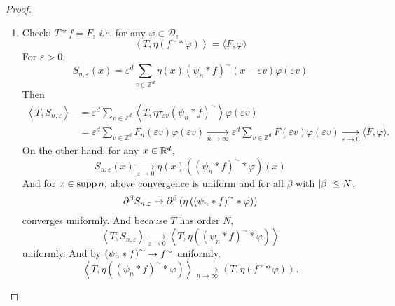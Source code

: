 \begin{enumerate}[label=\arabic*.]
\begin{proof}
\begin{enumerate}
			\item Check: $T * f = F$, \emph{i.e.} for any $\varphi \in \mathcal{D}$,
			\begin{equation*}
				\left\langle T, \eta\left(f^{\sim} * \varphi\right)\right\rangle=\langle F, \varphi\rangle
			\end{equation*}
			For $\varepsilon > 0$,
			\begin{equation*}
				S_{n, \varepsilon}(x)=\varepsilon^d \sum_{v \in \mathbb{Z}^d} \eta(x)\left(\psi_n * f\right)^{\sim}(x-\varepsilon v) \varphi(\varepsilon v)
			\end{equation*}
			Then
			\begin{equation*}
				\begin{aligned}
					\left\langle T, S_{n, \varepsilon}\right\rangle & =\varepsilon^d \sum_{v \in \mathbb{Z}^d}\left\langle T, \eta \tau_{\varepsilon v}\left(\psi_n * f\right)^{\sim}\right\rangle \varphi(\varepsilon v) \\
					& =\varepsilon^d \sum_{v \in \mathbb{Z}^d} F_n(\varepsilon v) \varphi(\varepsilon v) \underset{n \rightarrow \infty}{\rightarrow} \varepsilon^d \sum_{v \in \mathbb{Z}^d} F(\varepsilon v) \varphi(\varepsilon v) \underset{\varepsilon \rightarrow 0}{\rightarrow}\langle F, \varphi\rangle .
				\end{aligned}
			\end{equation*}
			On the other hand, for any $x \in \mathbb{R}^d$,
			\begin{equation*}
				S_{n, \varepsilon}(x) \underset{\varepsilon \rightarrow 0}{\rightarrow} \eta(x)\left(\left(\psi_n * f\right)^{\sim} * \varphi\right)(x)
			\end{equation*}
			And for $x \in \operatorname{supp} \eta$, above convergence is uniform and for all $\beta$ with $\left\lvert\beta\right\lvert \leq N$,
			\begin{equation*}
				\partial^\beta S_{n, \varepsilon} \rightarrow \partial^\beta\left(\eta\left(\left(\psi_n * f\right)^{\sim} * \varphi\right)\right)
			\end{equation*}
			converges uniformly. And because $T$ has order $N$,
			\begin{equation*}
				\left\langle T, S_{n, \varepsilon}\right\rangle \underset{\varepsilon \rightarrow 0}{\rightarrow}\left\langle T, \eta\left(\left(\psi_n * f\right)^{\sim} * \varphi\right)\right\rangle
			\end{equation*}
			uniformly. And by $\left(\psi_n * f\right)^{\sim}\rightarrow f^{\sim}$ uniformly,
			\begin{equation*}
				\left\langle T, \eta\left(\left(\psi_n * f\right)^{\sim} * \varphi\right)\right\rangle \underset{n \rightarrow \infty}{\rightarrow}\left\langle T, \eta\left(f^{\sim} * \varphi\right)\right\rangle .
			\end{equation*}
		\end{enumerate}
	\end{proof}


\end{enumerate}
